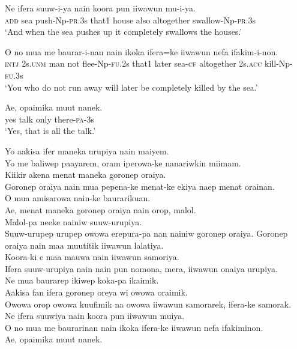 \ea
\gll  Ne  ifera  suuw-i-ya  nain  koora  pun  iiwawun  mu-i-ya. \\
\textsc{add}  sea  push-Np-\textsc{pr}.3s  that1  house  also  altogether  swallow-Np-\textsc{pr}.3s \\
\glt ‘And when the sea pushes up it completely swallows the houses.’ \\
\z


\ea
\gll  O  no  mua  me  baurar-i-nan  nain  ikoka  ifera=ke  iiwawun      nefa  ifakim-i-non. \\
\textsc{intj}  2s.\textsc{unm}  man  not  flee-Np-\textsc{fu}.2s  that1  later  sea-\textsc{cf}  altogether 2s.\textsc{acc}  kill-Np-\textsc{fu}.3s \\


\glt ‘You who do not run away will later be completely killed by the sea.’ \\
\z


\ea
\gll  Ae,  opaimika  muut  nanek. \\
yes  talk  only  there-\textsc{pa}-3s \\
\glt ‘Yes, that is all the talk.’ \\
\z


Yo aakisa ifer maneka urupiya nain maiyem. \\
Yo me baliwep paayarem, oram iperowa-ke nanariwkin miimam. \\
Kiikir akena menat maneka goronep oraiya. \\
Goronep oraiya nain mua pepena-ke menat-ke ekiya naep menat orainan. \\
O mua amisarowa nain-ke baurarikuan. \\
Ae, menat maneka goronep oraiya nain orop, malol. \\
Malol-pa neeke nainiw suuw-urupiya. \\
\textrm{Suuw-urupep urupep owowa erepura-pa nan nainiw goronep oraiya.}
Goronep oraiya nain maa muutitik iiwawun lalatiya. \\
Koora-ki e maa mauwa nain iiwawun samoriya. \\
Ifera suuw-urupiya nain nain pun nomona, mera, iiwawun onaiya urupiya. \\
Ne mua baurarep  ikiwep  koka-pa ikaimik. \\
Aakisa fan ifera goronep oreya  wi owowa oraimik. \\
Owowa orop owowa kuufimik na owowa iiwawun samorarek, ifera-ke samorak. \\
Ne ifera suuwiya nain koora pun iiwawun muiya. \\
O no mua me baurarinan nain ikoka ifera-ke iiwawun nefa ifakiminon. \\
\textrm{Ae, opaimika muut nanek.}
